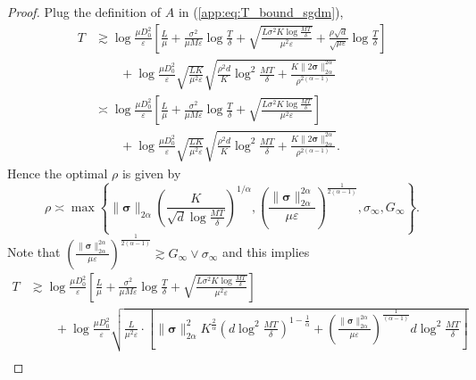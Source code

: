 \documentclass{article} %
\numberwithin{equation}{section}
\renewcommand{\eqref}[1]{(\ref{#1})}
\begin{document}
\begin{proof}
    Plug the definition of $A$ in \eqref{app:eq:T_bound_sgdm},
    \begin{equation}
        \begin{aligned}
            T
            &\gtrsim \log\frac{\mu D_0^2}{\varepsilon}\left[\frac{L}{\mu}+\frac{\sigma^2}{\mu M \varepsilon}\log\frac{T}{\delta}+\sqrt{\frac{L\sigma^2K\log\frac{MT}{\delta}}{\mu^2\varepsilon}}+\frac{\rho\sqrt{d}}{\sqrt{\mu\varepsilon}}\log\frac{T}{\delta}\right] \\
            &\qquad + \log\frac{\mu D_0^2}{\varepsilon}\sqrt{\frac{LK}{\mu^2\varepsilon}}\sqrt{\frac{\rho^2d}{K}\log^2\frac{MT}{\delta}+\frac{K\|2\boldsymbol{\sigma}\|_{2\alpha}^{2\alpha}}{\rho^{2(\alpha-1)}}} \\
            &\asymp \log\frac{\mu D_0^2}{\varepsilon}\left[\frac{L}{\mu}+\frac{\sigma^2}{\mu M \varepsilon}\log\frac{T}{\delta}+\sqrt{\frac{L\sigma^2K\log\frac{MT}{\delta}}{\mu^2\varepsilon}}\right] \\
            &\qquad + \log\frac{\mu D_0^2}{\varepsilon}\sqrt{\frac{LK}{\mu^2\varepsilon}}\sqrt{\frac{\rho^2d}{K}\log^2\frac{MT}{\delta}+\frac{K\|2\boldsymbol{\sigma}\|_{2\alpha}^{2\alpha}}{\rho^{2(\alpha-1)}}}.
        \end{aligned}
    \end{equation}
    Hence the optimal $\rho$ is given by 
    \begin{equation}
        \rho\asymp \max\left\{\|\boldsymbol{\sigma}\|_{2\alpha}\left(\frac{K}{\sqrt{d}\log\frac{MT}{\delta}}\right)^{1/\alpha}, \left(\frac{\|\boldsymbol{\sigma}\|_{2\alpha}^{2\alpha}}{\mu\varepsilon}\right)^{\frac{1}{2(\alpha-1)}}, \sigma_\infty, G_{\infty}\right\}.
    \end{equation}
    Note that $\left(\frac{\|\boldsymbol{\sigma}\|_{2\alpha}^{2\alpha}}{\mu\varepsilon}\right)^{\frac{1}{2(\alpha-1)}}\gtrsim G_\infty\vee \sigma_\infty$ and this implies 
    \begin{equation}
        \begin{aligned}
            T
            &\gtrsim \log\frac{\mu D_0^2}{\varepsilon}\left[\frac{L}{\mu}+\frac{\sigma^2}{\mu M \varepsilon}\log\frac{T}{\delta}+\sqrt{\frac{L\sigma^2K\log\frac{MT}{\delta}}{\mu^2\varepsilon}}\right] \\
            &\qquad + \log\frac{\mu D_0^2}{\varepsilon}\sqrt{\frac{L}{\mu^2\varepsilon}\cdot\left[\|\boldsymbol{\sigma}\|_{2\alpha}^2K^{\frac{2}{\alpha}}\left(d\log^2\frac{MT}{\delta}\right)^{1-\frac{1}{\alpha}} + \left(\frac{\|\boldsymbol{\sigma}\|_{2\alpha}^{2\alpha}}{\mu\varepsilon}\right)^{\frac{1}{(\alpha-1)}}d\log^2\frac{MT}{\delta}\right]} \\

\end{aligned}
\end{equation}
\end{proof}
\end{document}
